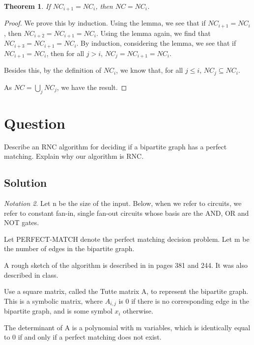 \documentclass[10pt]{amsart}
\newtheorem{thm}{Theorem}[subsection]
\theoremstyle{remark}
\newtheorem{notation}[thm]{Notation}
\begin{document}
\begin{thm}
If $NC_{i+1} = NC_{i}$, then $NC = NC_{i}$.
\end{thm}
\begin{proof}
We prove this by induction. Using the lemma, we see that if $NC_{i+1} = NC_{i}$, then $NC_{i+2} = NC_{i+1} = NC_{i}$. Using the lemma again, we find that $NC_{i+3} = NC_{i+1} = NC_{i}$. By induction, considering the lemma, we see that if $NC_{i+1} = NC_{i}$, then for all $j>i$, $NC_{j} = NC_{i+1} = NC_{i}$.

Besides this, by the definition of $NC_{i}$, we know that, for all $j\leq i$, $NC_{j} \subseteq NC_{i}$.

As $NC = \bigcup_{j} NC_{j}$, we have the result.
\end{proof}

\section{Question}
Describe an RNC algorithm for deciding if a bipartite graph has a perfect matching. Explain why our algorithm is RNC.

\subsection{Solution}
\begin{notation}
Let n be the size of the input. Below, when we refer to circuits, we refer to constant fan-in, single fan-out circuits whose basis are the AND, OR and NOT gates.

Let PERFECT-MATCH denote the perfect matching decision problem. Let m be the number of edges in the bipartite graph.
\end{notation}

A rough sketch of the algorithm is described in \cite{papadimitriouCC} in pages 381 and 244. It was also described in class.

Use a square matrix, called the Tutte matrix A, to represent the bipartite graph. This is a symbolic matrix, where $A_{i,j}$ is 0 if there is no corresponding edge in the bipartite graph, and is some symbol $x_{i}$ otherwise.

The determinant of A is a polynomial with m variables, which is identically equal to 0 if and only if a perfect matching does not exist.
\end{document}

